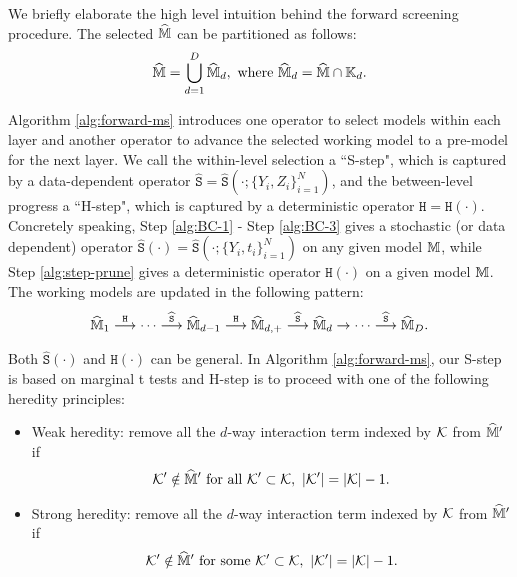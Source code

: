 \documentclass[12pt]{article}
\begin{document}
We briefly elaborate the high level intuition behind the forward screening procedure.  The selected $\widehat{{\mathbb{M}}}$ can be partitioned as follows:
\begin{align*}
    \widehat{{\mathbb{M}}} = \bigcup_{d=1}^D\widehat{{\mathbb{M}}}_d, \text{ where } \widehat{{\mathbb{M}}}_d = \widehat{{\mathbb{M}}}\cap {\mathbb{K}}_d.
\end{align*}

Algorithm \ref{alg:forward-ms} introduces one operator to select models within each layer and another operator to advance the selected working model to a pre-model for the next layer. We call the within-level selection a ``S-step", which is captured by a data-dependent operator $\hat{\texttt{S}} = \hat{\texttt{S}}(\cdot;\{Y_i,Z_i\}_{i=1}^N)$, and the between-level progress a ``H-step", which is captured by a deterministic operator $\texttt{H} = \texttt{H}(\cdot)$.  
Concretely speaking, Step \ref{alg:BC-1} - Step \ref{alg:BC-3} gives a stochastic (or data dependent) operator $\hat{\texttt{S}}(\cdot) = \hat{\texttt{S}}(\cdot; \{Y_i,t_i\}_{i=1}^N)$ on any given model ${\mathbb{M}}$, while Step \ref{alg:step-prune} gives a deterministic operator $\texttt{H}(\cdot)$ on a given model ${\mathbb{M}}$. The working models are updated in the following pattern:
\begin{align}\label{eqn:track-model}
    \widehat{{\mathbb{M}}}_{1}\stackrel{{\texttt{H}}}{\longrightarrow}\cdots\stackrel{{ \widehat{\texttt{S}}}}{\longrightarrow}\widehat{{\mathbb{M}}}_{d-1}\stackrel{{\texttt{H}}}{\longrightarrow}\widehat{{\mathbb{M}}}_{d,+}\stackrel{{ \widehat{\texttt{S}}}}{\longrightarrow}\widehat{{\mathbb{M}}}_{d}\to \cdots \stackrel{{ \widehat{\texttt{S}}}}{\longrightarrow} \widehat{{\mathbb{M}}}_{D}.
\end{align}

Both $\hat{\texttt{S}}(\cdot)$ and $\texttt{H}(\cdot)$ can be general. In Algorithm \ref{alg:forward-ms}, our S-step is based on marginal t tests and H-step is to proceed with one of the following heredity principles:
\begin{itemize}
\item Weak heredity: remove all the $d$-way interaction term indexed by ${\mathcal{K}}$ from $\widehat{{\mathbb{M}}}'$ if 
       \begin{align}
           {\mathcal{K}}'\notin \widehat{{\mathbb{M}}}' \text{ for all }{\mathcal{K}}'\subset{\mathcal{K}},~|{\mathcal{K}}'| = |{\mathcal{K}}| - 1. \label{eqn:weak-heredity}
       \end{align}

\item Strong heredity: remove all the $d$-way interaction term indexed by ${\mathcal{K}}$ from $\widehat{{\mathbb{M}}}'$ if 
       \begin{align}
           {\mathcal{K}}'\notin \widehat{{\mathbb{M}}}' \text{ for some }{\mathcal{K}}'\subset{\mathcal{K}},~|{\mathcal{K}}'| = |{\mathcal{K}}| - 1. \label{eqn:strong-heredity}
       \end{align}

\end{itemize}
\end{document}
